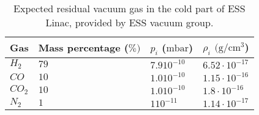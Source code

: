 \begin{table}[ht]
	\centering
	\caption[Expected residual vacuum gas in the cold part of ESS Linac, provided by ESS vacuum group]
	{Expected residual vacuum gas in the cold part of ESS Linac, provided by ESS vacuum group.}
	\label{chap3:ess_vacuum_gas}
	\begin{tabular}{llll}
		\toprule
		Gas        & Mass percentage (\(\%)\) & $p_{i}$ (\(\mathrm{mbar}\)) & $\rho_{i}$ $(\mathrm{g/cm^{3}}$) \\
		\midrule
		\(H_{2}\)  & \(79\)          & \(7.9 10^{-10}\)   & \(6.52\cdot
		10^{-17}\)                                                                \\
		\(CO\)     & \(10\)          & \(1.0 10^{-10}\)   & \(1.15\cdot
		10^{-16}\)                                                                \\
		\(CO_{2}\) & \(10\)          & \(1.0 10^{-10}\)   & \(1.8\cdot
		10^{-16}\)                                                                \\
		\(N_{2}\)  & \(1\)           & \(1 10^{-11}\)     & \(1.14\cdot
		10^{-17}\)                                                                \\
		\bottomrule
	\end{tabular}
\end{table}